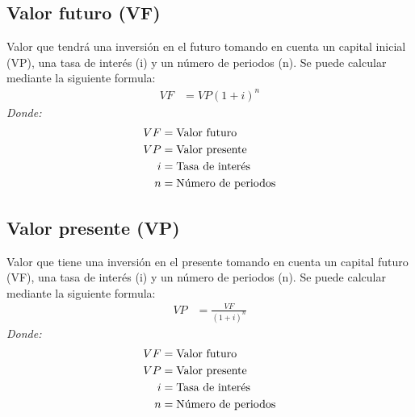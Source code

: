 \documentclass{templateNote}
\begin{document}
\subsection{Valor futuro (VF)}
\noindent Valor que tendrá una inversión en el futuro tomando en cuenta un capital inicial (VP), una tasa de interés (i) y un número de periodos (n). Se puede calcular mediante la siguiente formula:
\begin{align*}
    VF &= VP(1 + i)^n
\end{align*}
\textit{Donde:}
\begin{align*}
    VF &= \textnormal{Valor futuro}\\
    VP &= \textnormal{Valor presente}\\
    i &= \textnormal{Tasa de interés}\\
    n &= \textnormal{Número de periodos}\\
\end{align*} 

\subsection{Valor presente (VP)}
\noindent Valor que tiene una inversión en el presente tomando en cuenta un capital futuro (VF), una tasa de interés (i) y un número de periodos (n). Se puede calcular mediante la siguiente formula:
\begin{align*}
    VP &= \frac{VF}{(1 + i)^n}
\end{align*}
\textit{Donde:}
\begin{align*}
    VF &= \textnormal{Valor futuro}\\
    VP &= \textnormal{Valor presente}\\
    i &= \textnormal{Tasa de interés}\\
    n &= \textnormal{Número de periodos}\\
\end{align*}
\end{document}
